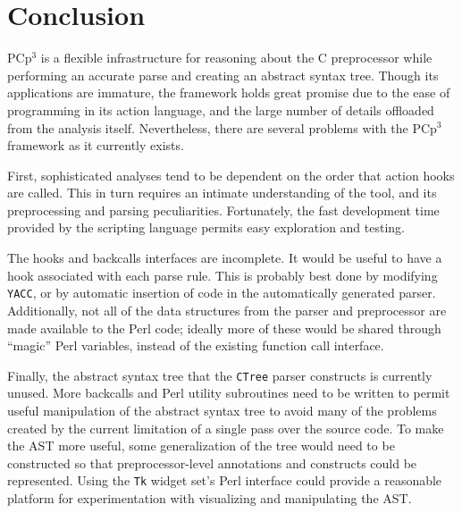 \documentclass{article}
\newcommand{\pcp}{\mbox{\textsf{PCp}$^3$}}
\newcommand{\Perl}{\mbox{\textsf{Perl}}}
\newcommand{\C}{\mbox{\textsf{C}}}
\begin{document}
\section{Conclusion}
\label{sec:conclusion}





\pcp{} is a flexible infrastructure for
reasoning about the \C{} preprocessor while performing an
accurate parse and creating an abstract syntax tree.  Though its
applications are immature, the framework holds great promise due
to the ease of programming in its action language, and the large number
of details offloaded from the analysis itself.  Nevertheless, there are several
problems with the \pcp{} framework as it currently exists.

First, sophisticated analyses tend to be dependent on the order that
action hooks are called.  This in turn requires an intimate
understanding of the tool, and its preprocessing and parsing
peculiarities.  Fortunately, the fast development time provided by the
scripting language permits easy exploration and testing.

The hooks and backcalls interfaces are incomplete.  It would be useful
to have a hook associated with each parse rule.  This is probably best
done by modifying \texttt{YACC}, or by automatic insertion of code in
the automatically generated parser.  Additionally, not all of the data
structures from the parser and preprocessor are made available to the
\Perl{} code;  ideally more of these would be shared through ``magic''
\Perl{} variables, instead of the existing function call interface.

Finally, the abstract syntax tree that the \texttt{CTree} parser
constructs is currently unused.  More backcalls and \Perl{} utility
subroutines need to be written to permit useful manipulation of the
abstract syntax tree to avoid many of the problems created by the current
limitation of a single pass over the source code.  To make the AST
more useful, some generalization of the tree would need to be
constructed so that preprocessor-level annotations and constructs could be
represented.  Using the \texttt{Tk} widget set's \Perl{} interface could
provide a reasonable platform for experimentation with visualizing and
manipulating the AST.
\end{document}

